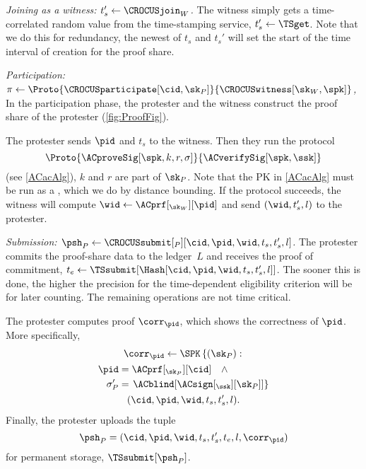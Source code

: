 \emph{Joining as a witness: \(t_s'\gets \CROCUSjoin_W\).}
The witness simply gets a time-correlated random value from the time-stamping service, \(t_s'\gets \TSget\).
Note that we do this for redundancy, the newest of \(t_s\) and \(t_s'\) will 
set the start of the time interval of creation for the proof share.


\emph{Participation: \(\pi\gets
    \Proto{\CROCUSparticipate[\cid, \sk_P]}{\CROCUSwitness[\sk_W, \spk]}\),}
In the participation phase, the protester and 
the witness construct the proof share of the protester (\cref{fig:ProofFig}).

The protester sends \(\pid\) and \(t_s\) to the witness.
Then they run the protocol \[
  \Proto{\ACproveSig[\spk, k, r, \sigma]}{\ACverifySig[\spk, \ssk]}
\] (see \cref{ACacAlg}), \(k\) and \(r\) are part of \(\sk_P\).
Note that the \acf{PK} in \cref{ACacAlg} must be
run as a , which we do by distance bounding.
If the protocol succeeds, the witness will compute \(\wid \gets 
  \ACprf[_{\sk_W}][\pid]\) and send \((\wid, t_s', l)\) to the protester.


\emph{Submission: \(\psh_P\gets \CROCUSsubmit[_P][\cid, \pid, \wid, t_s, t_s',  l]\).}
The protester commits the proof-share data to the ledger~\(L\) and receives the 
proof of commitment, \(t_e\gets \TSsubmit[\Hash[\cid, \pid, \wid, t_s, t_s', 
  l]]\).
The sooner this is done, the higher the precision for the time-dependent 
eligibility criterion will be for later counting.
The remaining operations are not time critical.

The protester computes  proof \(\corr_{\pid}\), which shows the 
correctness of \(\pid\).
More specifically,
\begin{multline*}
  \corr_{\pid}\gets \SPK\left\{ (\sk_P) : \right. \\
    \begin{aligned}
      \pid &= \ACprf[_{\sk_P}][\cid] \quad \land \\
      \sigma_P' &= \left. \ACblind[\ACsign[_{\ssk}][\sk_P]] \right\}
    \end{aligned} \\
      (\cid, \pid, \wid, t_s, t_s', l).
\end{multline*}
Finally, the protester uploads the tuple \[
  \psh_P = (\cid, \pid, \wid, t_s, t_s', t_e, l, \corr_{\pid})
\] for permanent storage, \(\TSsubmit[\psh_P]\).

